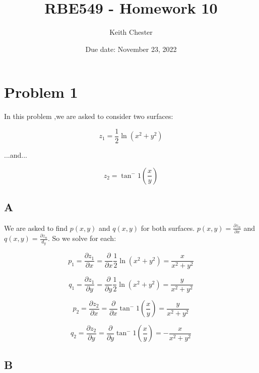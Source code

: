 \documentclass{article}
\title{RBE549 - Homework 10}
\author{Keith Chester}
\date{Due date: November 23, 2022}
\begin{document}
\maketitle

\section*{Problem 1}

In this problem ,we are asked to consider two surfaces:

\begin{equation}
    z_1 = \frac{1}{2} \ln(x^2 + y^2)
\end{equation}

\noindent ...and...

\begin{equation}
    z_2 = \tan^-1(\frac{x}{y})
\end{equation}

\subsection*{A}

We are asked to find $p(x,y)$ and $q(x,y)$ for both surfaces. $p(x,y)=\frac{\partial z_n}{\partial x}$ and $q(x,y)=\frac{\partial z_n}{d_y}$. So we solve for each:

\begin{equation}
    p_1 = \frac{\partial z_1}{\partial x} = \frac{\partial}{\partial x} \frac{1}{2} \ln(x^2 + y^2) = \frac{x}{x^2+y^2}
\end{equation}

\begin{equation}
    q_1 = \frac{\partial z_1}{\partial y} = \frac{\partial}{\partial y} \frac{1}{2} \ln(x^2 + y^2) = \frac{y}{x^2+y^2}
\end{equation}

\begin{equation}
    p_2 = \frac{\partial z_2}{\partial x} = \frac{\partial}{\partial x} \tan^-1(\frac{x}{y}) = \frac{y}{x^2 + y^2}
\end{equation}

\begin{equation}
    q_2 = \frac{\partial z_2}{\partial y} = \frac{\partial}{\partial y} \tan^-1(\frac{x}{y}) =  -\frac{x}{x^2+y^2}
\end{equation}

\subsection*{B}
\end{document}
